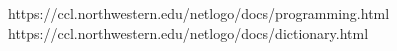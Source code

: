 \documentclass[a4paper,11pt,titlepage]{article}
\begin{document}
\newpage
{}
\listoffigures
\newpage

\listoftables

\begin{thebibliography}{5}
https://ccl.northwestern.edu/netlogo/docs/programming.html
https://ccl.northwestern.edu/netlogo/docs/dictionary.html

\end{thebibliography}
\end{document}
